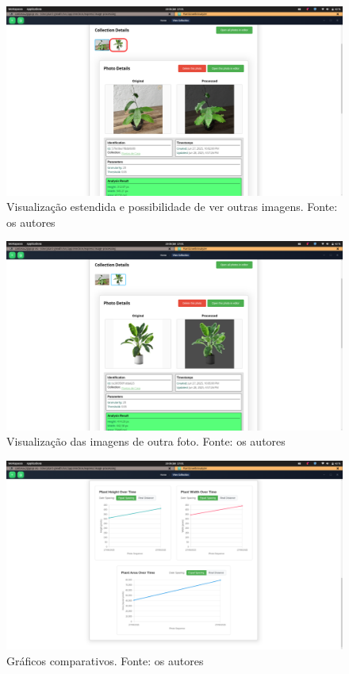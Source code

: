 \begin{figure}[H]
    \centering
    \includegraphics[width=1\textwidth]{../figures/screens/uc006/Screenshot from 2025-06-28 17-01-45.png}
    \caption{Visualização estendida e possibilidade de ver outras imagens. Fonte: os autores}
    \label{fig:uc006-screen3}
\end{figure}

\begin{figure}[H]
    \centering
    \includegraphics[width=1\textwidth]{../figures/screens/uc006/Screenshot from 2025-06-28 17-01-48.png}
    \caption{Visualização das imagens de outra foto. Fonte: os autores}
    \label{fig:uc006-screen4}
\end{figure}

\begin{figure}[H]
    \centering
    \includegraphics[width=1\textwidth]{../figures/screens/uc006/Screenshot from 2025-06-28 17-01-54.png}
    \caption{Gráficos comparativos. Fonte: os autores}
    \label{fig:uc006-screen5}
\end{figure}

